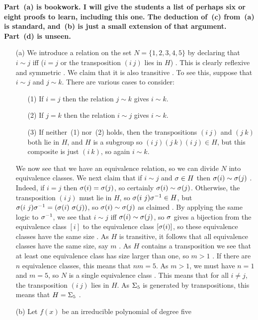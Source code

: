\documentclass[a4paper]{article}
\begin{document}
\begin{solution}
 \textbf{Part~(a) is bookwork.  I will give the students a list of
  perhaps six or eight proofs to learn, including this one.  The
  deduction of~(c) from~(a) is standard, and~(b) is just a small
  extension of that argument.  Part~(d) is unseen.}
 \begin{itemize}
  \item[(a)] We introduce a relation on the set $N=\{1,2,3,4,5\}$ by
   declaring that $i\sim j$ iff ($i=j$ or the transposition $(i~j)$
   lies in $H$) \mk.  This is clearly reflexive and symmetric \mk.  We claim
   that it is also transitive \mk.  To see this, suppose that $i\sim j$
   and $j\sim k$.  There are various cases to consider:
   \begin{itemize}
    \item[(1)] If $i=j$ then the relation $j\sim k$ gives $i\sim k$. \mk
    \item[(2)] If $j=k$ then the relation $i\sim j$ gives $i\sim k$.
    \item[(3)] If neither~(1) nor~(2) holds, then the transpositions
     $(i~j)$ and $(j~k)$ both lie in $H$, and $H$ is a subgroup so
     $(i~j)(j~k)(i~j)\in H$, but this composite is just $(i~k)$, so
     again $i\sim k$. \mk
   \end{itemize}
   We now see that we have an equivalence relation, so we can divide
   $N$ into equivalence classes.  We next claim that if $i\sim j$ and
   $\sigma\in H$ then $\sigma(i)\sim\sigma(j)$ \mk.  Indeed, if $i=j$ then
   $\sigma(i)=\sigma(j)$, so certainly $\sigma(i)\sim\sigma(j)$.  Otherwise, the
   transposition $(i~j)$ must lie in $H$, so $\sigma(i~j)\sigma^{-1}\in H$,
   but $\sigma(i~j)\sigma^{-1}=(\sigma(i)~\sigma(j))$, so $\sigma(i)\sim\sigma(j)$ as
   claimed \mk.  By applying the same logic to $\sigma^{-1}$, we see that
   $i\sim j$ iff $\sigma(i)\sim\sigma(j)$, so $\sigma$ gives a bijection from
   the equivalence class $[i]$ to the equivalence class $[\sigma(i)]$, so
   these equivalence classes have the same size \mk.  As $H$ is
   transitive, it follows that all equivalence classes have the same
   size, say $m$ \mk.  As $H$ contains a transposition we see that at
   least one equivalence class has size larger than one, so $m>1$ \mk.  If
   there are $n$ equivalence classes, this means that $nm=5$.  As
   $m>1$, we must have $n=1$ and $m=5$, so $N$ is a single equivalence
   class \mk.  This means that for all $i\neq j$, the transposition
   $(i~j)$ lies in $H$.  As $\Sigma_5$ is generated by transpositions,
   this means that $H=\Sigma_5$ \mk.
  \item[(b)] Let $f(x)$ be an irreducible polynomial of degree five

\end{itemize}
\end{solution}
\end{document}
